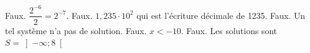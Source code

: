 %
%
    \begin{tasks}
        \task Faux. $\dfrac{2^{-6}}{2} = 2^{-7}$.
        \task Faux. $1, 235 \cdot 10^2$ qui est l'écriture décimale de \num{1235}.
        \task Faux. Un tel système n'a pas de solution.
        \task Faux. $x<-10$.
        \task Faux. Les solutions sont $S=\left]-\infty; 8\right[$
    \end{tasks}
